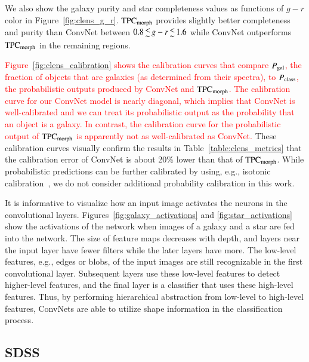 \documentclass[fleqn,usenatbib]{mnras}
\newcommand{\eg}{{e.g., }}
\newcommand{\changed}[1]{\textcolor{red}{#1}}
\begin{document}
We also show the galaxy purity and star completeness values as functions of
$g-r$ color in Figure~\ref{fig:clens_g_r}.
${\mathrm{TPC}}_{{\mathrm{morph}}}$ provides slightly better
completeness and purity than ConvNet between $0.8 \la g-r \la 1.6$ while
ConvNet outperforms ${\mathrm{TPC}}_{{\mathrm{morph}}}$ in the remaining regions.

\changed{
Figure~\ref{fig:clens_calibration} shows the calibration curves that compare
$P_{{\mathrm{gal}}}$,
the fraction of objects that are galaxies (as determined from their spectra),
to $P_{{\mathrm{class}}}$, the probabilistic outputs
produced by ConvNet and ${\mathrm{TPC}}_{{\mathrm{morph}}}$.
The calibration curve for our ConvNet model is nearly diagonal,
which implies that ConvNet is well-calibrated and we can treat its probabilistic
output as the probability that an object is a galaxy.
In contrast, the calibration curve
for the probabilistic output of ${\mathrm{TPC}}_{{\mathrm{morph}}}$
is apparently not as well-calibrated as ConvNet.
}
These calibration curves visually confirm the results in
Table~\ref{table:clens_metrics} that the calibration error
of ConvNet is about 20\% lower than that of ${\mathrm{TPC}}_{{\mathrm{morph}}}$.
While probabilistic predictions can be further calibrated by using,
\eg isotonic calibration~\citep{zadrozny2001obtaining},
we do not consider additional probability calibration in this work.

It is informative to visualize how an input image activates the neurons
in the convolutional layers.
Figures~\ref{fig:galaxy_activations} and \ref{fig:star_activations}
show the activations of the network when images of a galaxy and a star
are fed into the network.
The size of feature maps decreases with depth, and layers near the
input layer have fewer filters while the later layers have more.
The low-level features, \eg edges or blobs, of the input images are still
recognizable in the first convolutional layer.
Subsequent layers use these low-level features to detect higher-level features,
and the final layer is a classifier that uses these high-level features.
Thus, by performing hierarchical abstraction from low-level to high-level
features, ConvNets are able to utilize shape information in the classification
process.


\subsection{SDSS}
  \label{sec:results_sdss}
\end{document}

